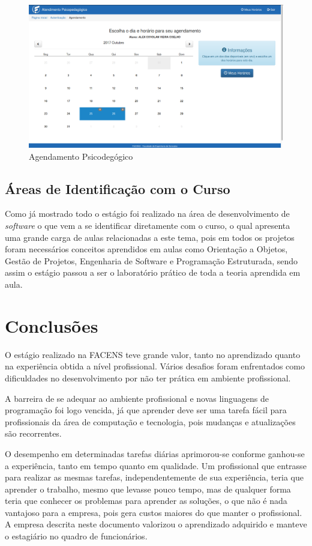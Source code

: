 \documentclass[
	12pt,				%
	oneside,			%
	a4paper,			%
	chapter=TITLE,		%
	section=TITLE,		%
	sumario=tradicional %
	english,			%
	french,				%
	spanish,			%
	brazil				%
	]{abntex2}
\begin{document}
\begin{figure}[htb]
	\caption{\label{fig:cas} Agendamento Psicodegógico}
	\begin{center}
		\includegraphics[scale=0.3]{cas}
	\end{center}
\end{figure}

\section{Áreas de Identificação com o Curso}
\label{sec:identcurso}
Como já mostrado todo o estágio foi realizado na área de desenvolvimento de \textit{software} o que vem a se identificar diretamente com o curso, o qual apresenta uma grande carga de aulas relacionadas a este tema, pois em todos os projetos foram necessários conceitos aprendidos em aulas como Orientação a Objetos, Gestão de Projetos, Engenharia de Software e Programação Estruturada, sendo assim o estágio passou a ser o laboratório prático de toda a teoria aprendida em aula.

\chapter{Conclusões}
\label{chap:chap6}
O estágio realizado na FACENS teve grande valor, tanto no aprendizado quanto na experiência obtida a nível profissional. Vários desafios foram enfrentados como dificuldades no desenvolvimento por não ter prática em ambiente profissional. 

A barreira de se adequar ao ambiente profissional e novas linguagens de programação foi logo vencida, já que aprender deve ser uma tarefa fácil para profissionais da área de computação e tecnologia, pois mudanças e atualizações são recorrentes.

O desempenho em determinadas tarefas diárias aprimorou-se conforme ganhou-se a experiência, tanto em tempo quanto em qualidade.  Um profissional que entrasse para realizar as mesmas tarefas, independentemente de sua experiência, teria que aprender o trabalho, mesmo que levasse pouco tempo, mas de qualquer forma teria que conhecer os problemas para aprender as soluções, o que não é nada vantajoso para a empresa, pois gera custos maiores do que manter o profissional. A empresa descrita neste documento valorizou o aprendizado adquirido e manteve o estagiário no quadro de funcionários.
\end{document}

